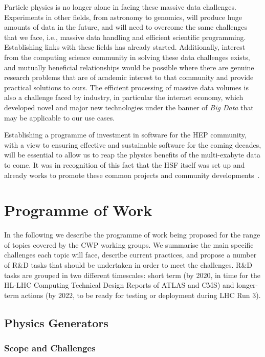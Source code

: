 \documentclass[twocolumn]{svjour3}          %
\begin{document}
Particle physics is no longer alone in facing these massive data
challenges. Experiments in other fields, from astronomy to genomics,
will produce huge amounts of data in the future, and will need to
overcome the same challenges that we face, i.e., massive data handling and
efficient scientific programming. Establishing links with these fields
has already started. Additionally, interest from the computing science
community in solving these data challenges exists, and mutually
beneficial relationships would be possible where there are genuine
research problems that are of academic interest to that community and
provide practical solutions to ours. The efficient processing of massive
data volumes is also a challenge faced by industry, in particular the
internet economy, which developed novel and major new technologies under
the banner of \emph{Big Data} that may be applicable to our use cases.

Establishing a programme of investment in software for the HEP
community, with a view to ensuring effective and sustainable software
for the coming decades, will be essential to allow us to reap the
physics benefits of the multi-exabyte data to come. It was in recognition of
this fact that the HSF itself was set up and already works to promote
these common projects and community developments~\cite{HSF2015}.

\hypertarget{programme-of-work}{%
\section{Programme of Work}\label{programme-of-work}}

In the following we describe the programme of work being proposed for
the range of topics covered by the CWP working groups. We summarise the
main specific challenges each topic will face, describe current
practices, and propose a number of R\&D tasks that should be undertaken
in order to meet the challenges. R\&D tasks are grouped in two different
timescales: short term (by 2020, in time for the HL-LHC Computing Technical Design Reports of
ATLAS and CMS) and longer-term actions (by 2022, to be ready for testing
or deployment during LHC Run 3).


\hypertarget{physics-generators}{%
\subsection{Physics Generators}\label{physics-generators}}

\subsubsection*{Scope and Challenges}
\end{document}
